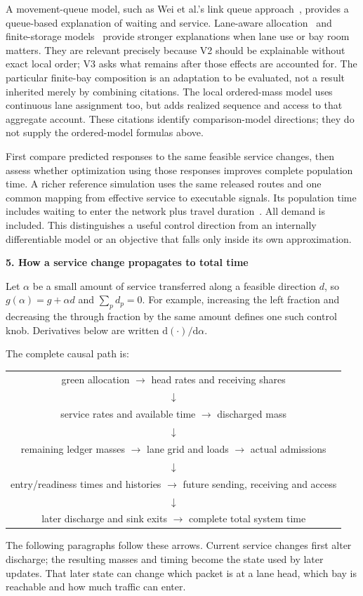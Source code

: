 \documentclass[10pt,a4paper]{article}
\newcommand{\head}[1]{\par\vspace{4pt}\noindent\textbf{#1}\par\nobreak\vspace{1pt}}
\newcommand{\rev}[1]{{\color{revisionred}#1}}
\begin{document}
A movement-queue model, such as Wei et al.'s link queue approach~\cite{wei},
provides a queue-based explanation of waiting and service. Lane-aware
allocation~\cite{gong} and finite-storage models~\cite{liu} provide
stronger explanations when lane use or bay room matters. They are relevant
precisely because V2 should be explainable without exact local order;
V3 asks what remains after those effects are accounted for. The particular
finite-bay composition is an adaptation to be evaluated, not a result
inherited merely by combining citations. The local ordered-mass model
uses continuous lane assignment too, but adds realized sequence and
access to that aggregate account.
\rev{These citations identify comparison-model directions; they do not supply the ordered-model formulas above.}

First compare predicted responses to the same feasible service changes,
then assess whether optimization using those responses improves complete
population time. A richer reference simulation uses the same released
routes and one common mapping from effective service to executable
signals. Its population time includes waiting to enter the network plus
travel duration~\cite{sumo}. All demand is included. This distinguishes
a useful control direction from an internally differentiable model or
an objective that falls only inside its own approximation.
\par


\head{5. How a service change propagates to total time}
Let $\alpha$ be a small amount of service transferred along a feasible
direction $d$, so $g(\alpha)=g+\alpha d$ and $\sum_p d_p=0$.
For example, increasing the left fraction and decreasing the through
fraction by the same amount defines one such control knob. Derivatives
below are written $\mathrm d(\cdot)/\mathrm d\alpha$.

The complete causal path is:
\begin{center}
\begin{tabular}{c}
green allocation $\longrightarrow$ head rates and receiving shares\\
$\downarrow$\\
service rates and available time $\longrightarrow$ discharged mass\\
$\downarrow$\\
remaining ledger masses $\longrightarrow$ lane grid and loads
$\longrightarrow$ actual admissions\\
$\downarrow$\\
entry/readiness times and histories $\longrightarrow$ future sending,
receiving and access\\
$\downarrow$\\
later discharge and sink exits $\longrightarrow$ complete total system time
\end{tabular}
\end{center}
The following paragraphs follow these arrows. Current service changes
first alter discharge; the resulting masses and timing become the state
used by later updates. That later state can change which packet is at a
lane head, which bay is reachable and how much traffic can enter.
\end{document}
